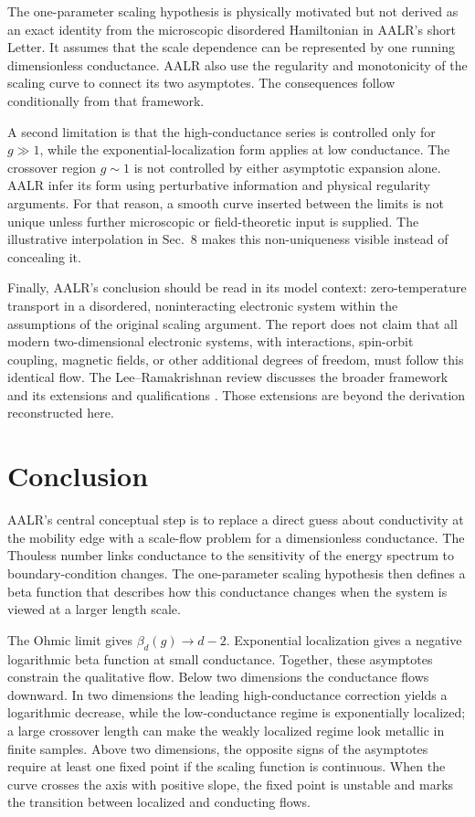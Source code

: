 \documentclass[11pt,a4paper]{article}
\numberwithin{equation}{section}
\begin{document}
The one-parameter scaling hypothesis is physically motivated but not derived as an exact identity from the microscopic disordered Hamiltonian in AALR's short Letter. It assumes that the scale dependence can be represented by one running dimensionless conductance. AALR also use the regularity and monotonicity of the scaling curve to connect its two asymptotes. The consequences follow conditionally from that framework.

A second limitation is that the high-conductance series is controlled only for $g\gg1$, while the exponential-localization form applies at low conductance. The crossover region $g\sim1$ is not controlled by either asymptotic expansion alone. AALR infer its form using perturbative information and physical regularity arguments. For that reason, a smooth curve inserted between the limits is not unique unless further microscopic or field-theoretic input is supplied. The illustrative interpolation in Sec.~8 makes this non-uniqueness visible instead of concealing it.

Finally, AALR's conclusion should be read in its model context: zero-temperature transport in a disordered, noninteracting electronic system within the assumptions of the original scaling argument. The report does not claim that all modern two-dimensional electronic systems, with interactions, spin-orbit coupling, magnetic fields, or other additional degrees of freedom, must follow this identical flow. The Lee--Ramakrishnan review discusses the broader framework and its extensions and qualifications \cite{LeeRamakrishnan1985}. Those extensions are beyond the derivation reconstructed here.

\section{Conclusion}

AALR's central conceptual step is to replace a direct guess about conductivity at the mobility edge with a scale-flow problem for a dimensionless conductance. The Thouless number links conductance to the sensitivity of the energy spectrum to boundary-condition changes. The one-parameter scaling hypothesis then defines a beta function that describes how this conductance changes when the system is viewed at a larger length scale.

The Ohmic limit gives $\beta_d(g)\to d-2$. Exponential localization gives a negative logarithmic beta function at small conductance. Together, these asymptotes constrain the qualitative flow. Below two dimensions the conductance flows downward. In two dimensions the leading high-conductance correction yields a logarithmic decrease, while the low-conductance regime is exponentially localized; a large crossover length can make the weakly localized regime look metallic in finite samples. Above two dimensions, the opposite signs of the asymptotes require at least one fixed point if the scaling function is continuous. When the curve crosses the axis with positive slope, the fixed point is unstable and marks the transition between localized and conducting flows.
\end{document}
